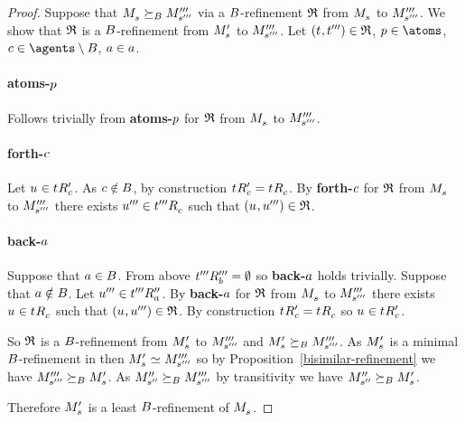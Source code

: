 \begin{proof}
Suppose that $\kPModel{\kStateS} \simulatesBs \kPModelPPP{\kStateSPPP}$ via a $B$-refinement $\mathfrak{R}$ from $\kPModel{\kStateS}$ to ${M^{\prime\prime\prime}_{{s}^{\prime\prime\prime}}}$.
We show that $\mathfrak{R}$ is a $B$-refinement from $\kPModelP{\kStateS}$ to ${M^{\prime\prime\prime}_{{s}^{\prime\prime\prime}}}$.
Let $(\kStateT, \kStateTPPP) \in \refinement$, $\atomP \in \atoms$, $\agentC \in \agents \setminus \agentsB$, $a \in a$.

\paragraph{atoms-$p$}
Follows trivially from {\bf atoms-$p$} for $\mathfrak{R}$ from $\kPModel{\kStateS}$ to ${M^{\prime\prime\prime}_{{s}^{\prime\prime\prime}}}$.

\paragraph{forth-$c$}
Let $\kStateU \in \kSuccessorsPC{\kStateT}$.
As $c \notin B$, by construction $\kSuccessorsPC{\kStateT} = \kSuccessorsC{\kStateT}$.
By {\bf forth-$c$} for $\mathfrak{R}$  from $\kPModel{\kStateS}$ to ${M^{\prime\prime\prime}_{{s}^{\prime\prime\prime}}}$ there exists $\kStateUPPP \in \kSuccessorsC{\kStateTPPP}$ such that $(\kStateU, \kStateUPPP) \in \refinement$.

\paragraph{back-$a$}
Suppose that $a \in B$.
From above ${{t}^{\prime\prime\prime}} {R^{\prime\prime\prime}_{b}} = \emptyset$ so {\bf back-$a$} holds trivially.
Suppose that $a \notin B$.
Let ${u}^{\prime\prime\prime} \in {{t}^{\prime\prime\prime}} {R^{\prime\prime}_{a}}$.
By {\bf back-$a$} for $\mathfrak{R}$ from $\kPModel{\kStateS}$ to ${M^{\prime\prime\prime}_{{s}^{\prime\prime\prime}}}$ there exists $\kStateU \in \kSuccessorsC{\kStateT}$ such that $(\kStateU, \kStateUPPP) \in \refinement$.
By construction $\kSuccessorsPC{\kStateT} = \kSuccessorsC{\kStateT}$ so $\kStateU \in \kSuccessorsPC{\kStateT}$.

So $\mathfrak{R}$ is a $B$-refinement from $\kPModelP{\kStateS}$ to ${M^{\prime\prime\prime}_{{s}^{\prime\prime\prime}}}$ and $\kPModelP{\kStateS} \simulatesBs \kPModelPPP{\kStateSPPP}$.
As $\kPModelP{\kStateS}$ is a minimal $B$-refinement in \classC{} then $\kPModelP{\kStateS} \bisimilar \kPModelPPP{\kStateSPPP}$ so by Proposition~\ref{bisimilar-refinement} we have $\kPModelPPP{\kStateSPPP} \simulatesBs \kPModelP{\kStateS}$.
As ${M^{\prime\prime}_{{s}^{\prime\prime}}} \succeq_{B} {M^{\prime\prime\prime}_{{s}^{\prime\prime\prime}}}$ by transitivity we have $\kPModelPP{\kStateSPP} \simulatesBs \kPModelP{\kStateS}$.

Therefore $\kPModelP{\kStateS}$ is a least $B$-refinement of $\kPModel{\kStateS}$.
\end{proof}

